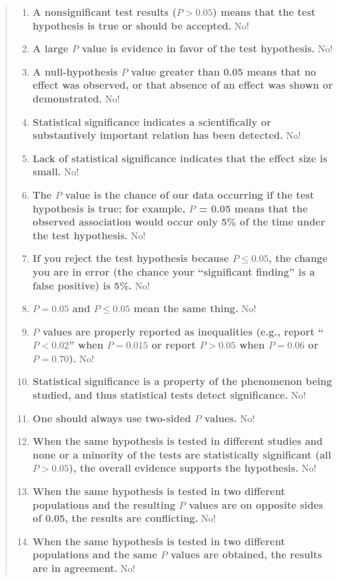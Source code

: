 \begin{quote}
\begin{enumerate}
{      the test hypothesis is false or should be rejected.} No!
  \item \textbf{A nonsignificant test results ($P > 0.05$) means that
      the test hypothesis is true or should be accepted.} No!
  \item \textbf{A large $P$ value is evidence in favor of the test
      hypothesis.} No!
  \item \textbf{A null-hypothesis $P$ value greater than 0.05 means
      that no effect was observed, or that absence of an effect was
      shown or demonstrated.} No!
  \item \textbf{Statistical significance indicates a scientifically or
      substantively important relation has been detected.} No!
  \item \textbf{Lack of statistical significance indicates that the
      effect size is small.} No!
  \item \textbf{The $P$ value is the chance of our data occurring if
      the test hypothesis is true; for example, $P$ = 0.05 means that
      the observed association would occur only 5\% of the time under
      the test hypothesis.} No!
  \item \textbf{If you reject the test hypothesis because $P \leq
      0.05$, the change you are in error (the chance your
      ``significant finding'' is a false positive) is 5\%.} No!
  \item \textbf{$P = 0.05$ and $P \leq 0.05$ mean the same thing.} No!
  \item \textbf{$P$ values are properly reported as inequalities (e.g., report ``$P < 0.02$'' when $P = 0.015$ or report $P > 0.05$ when $P = 0.06$ or $P = 0.70$).} No!
  \item \textbf{Statistical significance is a property of the phenomenon being studied, and thus statistical tests detect significance.} No!
  \item \textbf{One should always use two-sided $P$ values.} No!
  \item \textbf{When the same hypothesis is tested in different studies and none or a minority of the tests are statistically significant (all $P > 0.05$), the overall evidence supports the hypothesis.} No!
  \item \textbf{When the same hypothesis is tested in two different populations and the resulting $P$ values are on opposite sides of 0.05, the results are conflicting.} No!
  \item \textbf{When the same hypothesis is tested in two different populations and the same $P$ values are obtained, the results are in agreement.} No!

\end{enumerate}
\end{quote}
